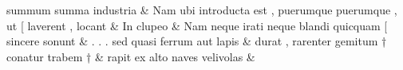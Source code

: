 \documentclass[12pt,onecolumn,twoside,a4paper]{memoir}
\begin{document}
\begin{pairs}
\begin{Leftside}
                              summum
                              summa
                              industria \&
                         \stanza {}Nam
                              ubi
                              introducta
                              est
                              ,
                              puerumque
                              {puerumque}
                              ,
                              ut
                              [
                              laverent
                              ,
                              locant & 
                     In
                              clupeo \&
                         \stanza {}
                     Nam
                              neque
                              irati
                              neque
                              blandi
                              quicquam
                              [
                              sincere
                              sonunt \&
                         \stanza {}.
                              .
                              .
                              sed
                              quasi
                              ferrum
                              aut
                              lapis & 
                     durat
                              ,
                              rarenter
                              gemitum
                              †
                              conatur
                              trabem
                              † \&
                         \stanza {}
                     rapit
                              ex
                              alto
                              naves
                              velivolas \&
                     
                  \endnumbering
		\end{Leftside}
                  \begin{Rightside}
			\beginnumbering
			\numberstanzafalse
                     

\end{Rightside}
\end{pairs}
\end{document}
